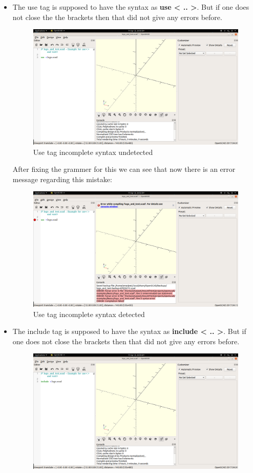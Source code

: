 \begin{itemize}
	\item The use tag is supposed to have the syntax as \textbf{use < .. >}. But if one does not close the the brackets then that did not give any errors before.
	\begin{figure}
		\centering
		\includegraphics[width=\linewidth]{images/output/grammer_use_old.png}
		\caption{Use tag incomplete syntax undetected}
	\end{figure}
	After fixing the grammer for this we can see that now there is an error message regarding this mistake:
	\begin{figure}
		\centering
		\includegraphics[width=\linewidth]{images/output/grammer_use_new.png}
		\caption{Use tag incomplete syntax detected}
	\end{figure}
	\item The include tag is supposed to have the syntax as \textbf{include < .. >}. But if one does not close the brackets then that did not give any errors before.
	\begin{figure}
		\centering
		\includegraphics[width=\linewidth]{images/output/grammer_include_old.png}

\end{figure}
\end{itemize}
